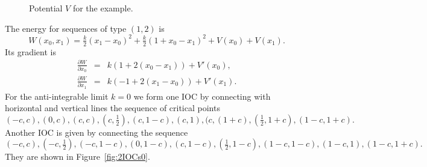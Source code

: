 \documentclass[12pt]{article}
\begin{document}
\begin{figure}[htbp] %
   \centering

   \caption{Potential $V$ for the example.}
   \label{fig:V}
\end{figure}

The energy for sequences of type $(1,2)$ is
\begin{equation}
W(x_0,x_1) = \tfrac{k}{2}(x_1-x_0)^2 + \tfrac{k}{2}(1+x_0-x_1)^2 + V(x_0) + V(x_1).
\end{equation}
Its gradient is
\begin{eqnarray}
\frac{\partial W}{\partial x_0} &=& k(1+ 2(x_0-x_1)) + V'(x_0), \\
\frac{\partial W}{\partial x_1} &=& k(-1+2(x_1-x_0)) + V'(x_1).
\end{eqnarray}
For the anti-integrable limit $k=0$ we form one IOC by connecting with horizontal and vertical lines the sequence of critical points
$$(-c,c), (0,c), (c,c), (c,\tfrac12), (c,1-c), (c,1), (c,(1+c), (\tfrac12, 1+c), (1-c,1+c).$$  Another IOC is given by connecting the sequence
$$(-c,c), (-c,\tfrac12), (-c,1-c), (0,1-c), (c, 1-c), (\tfrac12,1-c), (1-c,1-c), (1-c, 1), (1-c,1+c).$$
They are shown in Figure~\ref{fig:2IOCs0}.
\end{document}
